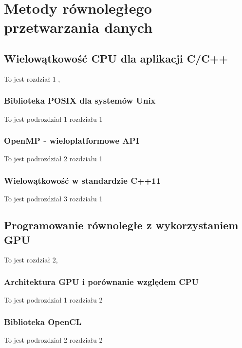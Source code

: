 \documentclass[document.tex]{subfiles}
\begin{document}
\chapter{Metody równoległego przetwarzania danych}
\section{Wielowątkowość CPU dla aplikacji C/C++}
To jest rozdział 1 \cite{wikipedia1},\cite{wikipedia2}
	\subsection{Biblioteka POSIX dla systemów Unix}
	To jest podrozdział 1 rozdziału 1
	\subsection{OpenMP - wieloplatformowe API}
	To jest podrozdział 2 rozdziału 1
	\subsection{Wielowątkowość w standardzie C++11}
	To jest podrozdział 3 rozdziału 1
\section{Programowanie równoległe z wykorzystaniem GPU}
	To jest rozdział 2\cite{wikipedia1},\cite{goossens93}
\cite{wikipedia2}
	\subsection{Architektura GPU i porównanie względem CPU}
	To jest podrozdział 1 rozdziału 2
	\subsection{Biblioteka OpenCL}
	To jest podrozdział 2 rozdziału 2
\end{document}
